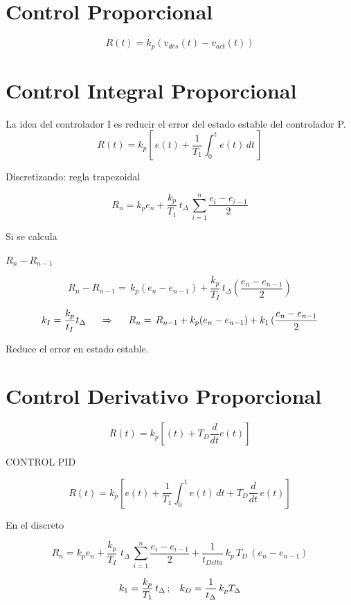
\section{Control Proporcional}

$$
R(t) = k_{p} (v_{des}(t)-v_{act}(t))
$$

\section{Control Integral Proporcional}

La idea del controlador I es reducir el error del estado estable del controlador P. 
$$
R(t) = k_{p} [  \,e(t)+ \dfrac{1}{T_{1}}\int_{0}^{t} \! e(t) \,dt\, ]
$$

Discretizando: regla trapezoidal

$$
R_{n} = k_{p} e_{n} + \dfrac{k_{p}}{T_{1}} \, t_{\Delta} \, \sum_{i=1}^{n} \dfrac{e_{i}-e_{i-1}}{2}
$$

Si se calcula \hspace{0.3cm}  

$R_{n}-R_{n-1}$

$$R_{n}-R_{n-1} =\, k_{p}(e_{n}-e_{n-1}) + \dfrac{k_{p}}{T_{I}} \, t_{\Delta}(\dfrac{e_{n}-e_{n-1}}{2})
$$
	
$$
k_{I} = \dfrac{k_p}{t_I} t_{\Delta} \hspace{0.5cm} \Rightarrow \hspace{0.5cm} R_n= \, R_{n-1} + k_p(e_n - e_{n-1}) + k_1 \, (\dfrac{e_n - e_{n-1}}{2}
$$

Reduce el error en estado estable.

\section{Control Derivativo Proporcional}

$$
R(t)= k_p \left [(t)+ T_D \dfrac{d}{dt} e(t) \right ]
$$

CONTROL PID

$$
R(t)=k_p \left [e(t)+ \dfrac{1}{T_1} \int_{0}^{1} e(t) \, dt + T_D \dfrac{d}{dt} \, e(t) \right ]
$$

En el discreto

$$
R_{n} = k_{p} e_{n} + \dfrac{k_{p}}{T_{I}} \,\, t_{\Delta} \, \sum_{i=1}^{n} \dfrac{e_{i}-e_{i-1}}{2} + \dfrac{1}{t_{Delta}} \, k_p \, T_D \, (e_n - e_{n-1})
$$

$$
k_1 = \dfrac{k_p}{T_1} \, t_{\Delta} \, ; \hspace{0.3cm} k_D = \dfrac{1}{t_{\Delta}} \,k_p T_{\Delta}
$$

